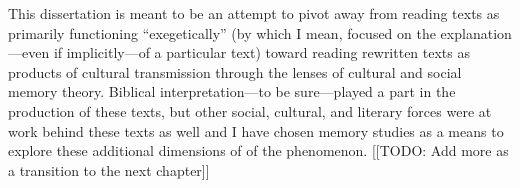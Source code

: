 

This dissertation is meant to be an attempt to pivot away from reading \rwb texts as primarily functioning ``exegetically'' (by which I mean, focused on the explanation---even if implicitly---of a particular text) toward reading rewritten texts as products of cultural transmission through the lenses of cultural and social memory theory. Biblical interpretation---to be sure---played a part in the production of these texts, but other social, cultural, and literary forces were at work behind these texts as well and I have chosen memory studies as a means to explore these additional dimensions of of the \rwb phenomenon. [[TODO: Add more as a transition to the next chapter]]